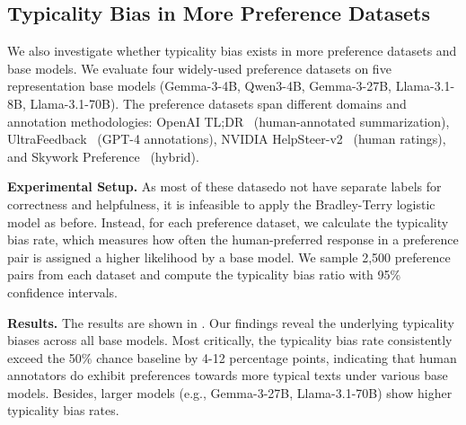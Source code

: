 


\subsection{Typicality Bias in More Preference Datasets}\label{appendix:preference_bias_base_model}

  We also investigate whether typicality bias exists in more preference datasets and base models. We evaluate four widely-used preference datasets on five representation base models (Gemma-3-4B, Qwen3-4B,
  Gemma-3-27B, Llama-3.1-8B, Llama-3.1-70B). The preference
  datasets span different domains and annotation methodologies: OpenAI TL;DR~\citep{stienon2020learning} (human-annotated
  summarization), UltraFeedback~\citep{cui2023ultrafeedback} (GPT-4 annotations), NVIDIA HelpSteer-v2~\citep{wang2024helpsteer2} (human ratings), and
  Skywork Preference~\citep{liu2024skywork} (hybrid).

  \textbf{Experimental Setup.} As most of these datasedo not have separate labels for correctness and helpfulness, it is infeasible to apply the Bradley-Terry logistic model as before. Instead, for each preference dataset, we calculate the typicality bias rate, which measures how often the human-preferred response in a preference pair is assigned a higher likelihood by a base model. We sample 2,500 preference
   pairs from each dataset and compute the typicality bias ratio with 95\% confidence intervals. 

  \textbf{Results.} The results are shown in . Our findings reveal the underlying typicality biases across all base
  models. Most critically, the typicality bias rate  consistently exceed the 50\% chance
  baseline by 4-12 percentage points, indicating that human annotators do exhibit preferences towards more typical texts  under various base models. Besides, larger models (e.g., Gemma-3-27B, Llama-3.1-70B) show higher typicality bias rates. %

